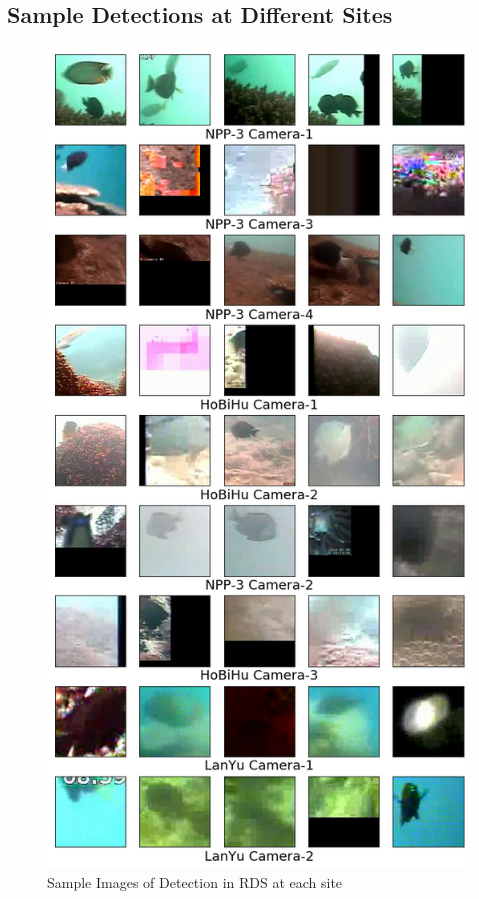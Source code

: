 \documentclass[bsc,frontabs,twoside,fullspacing,parskip,deptreport]{infthesis}
\begin{document}
\subsection{Sample Detections at Different Sites}

\begin{figure}[h]
    \centering
    \includegraphics[scale=0.4]{graph/samplesite2.png}
    \caption{Sample Images of Detection in RDS at each site}
    \label{fig:samplesite}
\end{figure}
\end{document}

